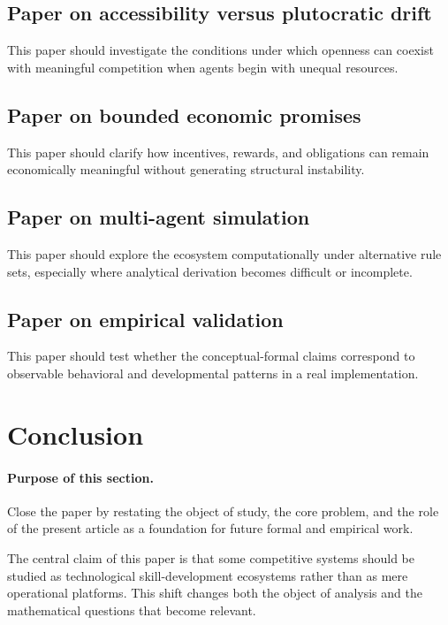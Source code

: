 \documentclass[11pt]{article}
\begin{document}
\subsection{Paper on accessibility versus plutocratic drift}

This paper should investigate the conditions under which openness can coexist with meaningful competition when agents begin with unequal resources.

\subsection{Paper on bounded economic promises}

This paper should clarify how incentives, rewards, and obligations can remain economically meaningful without generating structural instability.

\subsection{Paper on multi-agent simulation}

This paper should explore the ecosystem computationally under alternative rule sets, especially where analytical derivation becomes difficult or incomplete.

\subsection{Paper on empirical validation}

This paper should test whether the conceptual-formal claims correspond to observable behavioral and developmental patterns in a real implementation.

\section{Conclusion}

\paragraph{Purpose of this section.}
Close the paper by restating the object of study, the core problem, and the role of the present article as a foundation for future formal and empirical work.

The central claim of this paper is that some competitive systems should be studied as technological skill-development ecosystems rather than as mere operational platforms. This shift changes both the object of analysis and the mathematical questions that become relevant.
\end{document}
